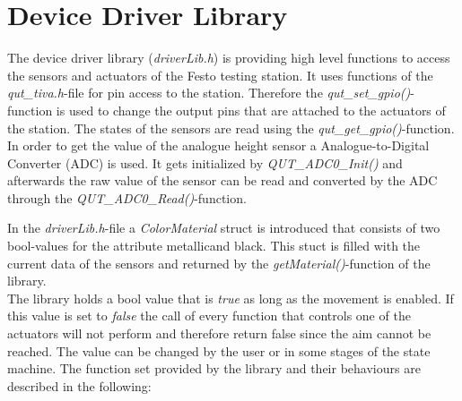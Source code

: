 \section{Device Driver Library} %


The device driver library (\textit{driverLib.h}) is providing high level functions to access the sensors and actuators of the Festo testing station. 
It uses functions of the \textit{qut\_tiva.h}-file for pin access to the station. 
Therefore the \textit{qut\_set\_gpio()}-function is used to change the output pins that are attached to the actuators of the station. The states of the sensors are read using the \textit{qut\_get\_gpio()}-function. In order to get the value of the analogue height sensor a Analogue-to-Digital Converter (ADC) is used. It gets initialized by \textit{QUT\_ADC0\_Init()} and afterwards the raw value of the sensor can be read and converted by the ADC through the \textit{QUT\_ADC0\_Read()}-function. 

In the \textit{driverLib.h}-file a \textit{ColorMaterial} struct is introduced that consists of two bool-values for the attribute \glq metallic\grq and \glq black\grq. This stuct is filled with the current data of the sensors and returned by the \textit{getMaterial()}-function of the library.\\

The library holds a bool value that is \textit{true} as long as the movement is enabled. If this value is set to \textit{false} the call of every function that controls one of the actuators will not perform and therefore return false since the aim cannot be reached. The value can be changed by the user or in some stages of the state machine. 
The function set provided by the library and their behaviours are described in the following: 

